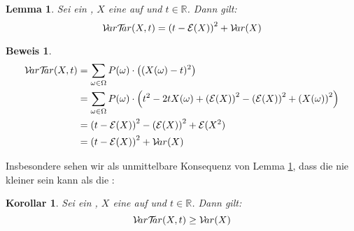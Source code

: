 \documentclass[a4paper]{article}
\newtheorem{korollar}[satz]{Korollar}
\newtheorem{lemma}[satz]{Lemma}
\theoremstyle{nonumberplain}
\newtheorem{beweis}{Beweis}
\begin{document}
	
	\begin{lemma}\label{lem-vtqf}
		Sei \probspaceex{} ein \probspace{}, $X$ eine \rvar{} auf \probspaceex{} und $t \in \mathbb{R}$. Dann gilt:
		\begin{equation}
		\mathcal{V}\!ar \mathcal{T}\!\!ar(X,t) = \left(t - \mathcal{E}(X)\right)^2 + \mathcal{V}\!ar(X)
		\end{equation}
	\end{lemma}
	\begin{beweis}
		\begin{align*}
		\mathcal{V}\!ar \mathcal{T}\!\!ar(X,t) & =  \sum_{\omega \in \Omega}{P(\omega) \cdot \left((X(\omega)-t)^2\right)} \\
		& = \sum_{\omega \in \Omega}{P(\omega) \cdot \left(t^2 -2tX(\omega) + \left(\mathcal{E}(X)\right)^2 - \left(\mathcal{E}(X)\right)^2 + \left(X(\omega)\right)^2\right)} \\
		& = \left(t - \mathcal{E}(X)\right)^2 - \left(\mathcal{E}(X)\right)^2 + \mathcal{E}(X^2) \\
		& = \left(t - \mathcal{E}(X)\right)^2 + \mathcal{V}\!ar(X) \\
		\end{align*}
	\end{beweis}
	Insbesondere sehen wir als unmittelbare Konsequenz von Lemma \ref{lem-vtqf}, dass die \vt{} nie kleiner sein kann als die \var{}:
	\begin{korollar}\label{kor-vtt-rel}
		Sei \probspaceex{} ein \probspace{}, $X$ eine \rvar{} auf \probspaceex{} und $t \in \mathbb{R}$. Dann gilt:
		\begin{equation}
		\mathcal{V}\!ar \mathcal{T}\!\!ar(X,t) \geq \mathcal{V}\!ar(X)
		\end{equation}
	\end{korollar}
	\begin{comment}
	\begin{beweis}
	Sei $\mu = \mathcal{E}_{\probspaceexraw{}}(X)$ der Erwartungswert von $X$. So erhalten wir:
	\begin{align*}
	& & (t-\mu)^2 &\geq 0\\
	\implies & & -2t\mu + 2\mu^2 + t^2 - \mu^2 &\geq 0\\
	\implies & & \sum_{\omega \in \Omega}{P(\omega)} \cdot (-2t X(\omega) + 2\mu X(\omega) + t^2 - \mu^2) &\geq 0\\
	\implies & & \sum_{\omega \in \Omega}{P(\omega)} \cdot \left((X(\omega)-t)^2 - (X(\omega) - \mu)^2\right) &\geq 0\\
	\implies & & \sum_{\omega \in \Omega}{P(\omega)} \cdot \left((X(\omega)-t)^2\right) &\geq \sum_{\omega \in \Omega}{P(\omega)} \cdot \left((X(\omega) - \mu)^2\right)\\
	\end{align*}
	\end{beweis}
	\end{comment}
	
\end{document}
